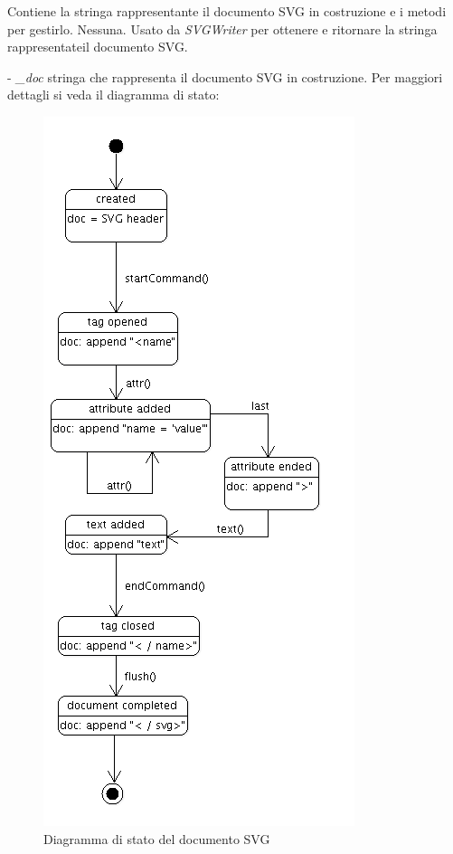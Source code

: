 Contiene la stringa rappresentante il documento SVG in costruzione e i metodi per gestirlo.
Nessuna.
Usato da \textit{SVGWriter} per ottenere e ritornare la stringa rappresentateil documento SVG.
\begin{elencopuntato}[\subsubsecindent]
\item[-] \textit{{\_}doc} stringa che rappresenta il documento SVG in costruzione.
Per maggiori dettagli si veda il diagramma di stato: \newpage

\begin{figure}[!ht]
\centering
\includegraphics[scale=0.7]{svgdocument.png}
\caption{Diagramma di stato del documento SVG}
\end{figure}

\end{elencopuntato}
